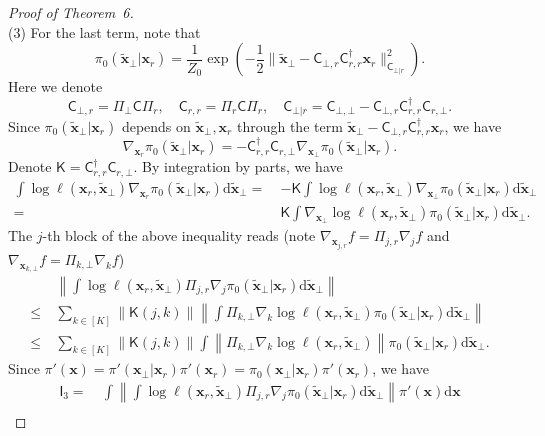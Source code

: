 \documentclass[10pt,a4paper]{amsart}
\newcommand{\Brac}[1]{\left(#1\right)}
\newcommand{\bx}{{\boldsymbol{x}}}
\newcommand{\mdd}{\mathrm{d}}
\newcommand{\norm}[1]{\left\|#1\right\|}
\newcommand{\normo}[1]{\|#1\|}
\newcommand{\sfC}{\mathsf{C}}
\newcommand{\sfI}{\mathsf{I}}
\newcommand{\sfK}{\mathsf{K}}
\begin{document}
\begin{proof}[Proof of Theorem~6]
\ \\[-5pt]
\noindent
(3) For the last term, note that
\[
    \pi_0(\widetilde{\bx}_\bot|\bx_r) = \frac{1}{Z_0} \exp \Brac{ - \frac{1}{2} \normo{ \widetilde{\bx}_\bot - \sfC_{\bot,r} \sfC_{r,r}^\dag \bx_r }^2_{\sfC_{\bot|r}}  }.
\]
Here we denote 
\[
    \sfC_{\bot,r} = \Pi_{\bot} \sfC \Pi_{r}, \quad \sfC_{r,r} = \Pi_{r} \sfC \Pi_{r}, \quad \sfC_{\bot|r} = \sfC_{\bot,\bot} - \sfC_{\bot,r} \sfC_{r,r}^\dag \sfC_{r,\bot}.
\]
Since $\pi_0(\widetilde{\bx}_\bot|\bx_r)$ depends on $\widetilde{\bx}_\bot,\bx_r$ through the term $\widetilde{\bx}_\bot - \sfC_{\bot,r} \sfC_{r,r}^\dag \bx_r$, we have
\[
    \nabla_{\bx_r} \pi_0(\widetilde{\bx}_\bot|\bx_r) = - \sfC_{r,r}^\dag \sfC_{r,\bot} \nabla_{\bx_\bot} \pi_0(\widetilde{\bx}_\bot|\bx_r). 
\]
Denote $\sfK = \sfC_{r,r}^\dag \sfC_{r,\bot}$. By integration by parts, we have 
\begin{align*}
    \int \log \ell(\bx_r,\widetilde{\bx}_\bot) \nabla_{\bx_r} \pi_0(\widetilde{\bx}_\bot|\bx_r) \mdd \widetilde{\bx}_\bot =~& - \sfK \int \log \ell(\bx_r,\widetilde{\bx}_\bot) \nabla_{\bx_\bot} \pi_0(\widetilde{\bx}_\bot|\bx_r) \mdd \widetilde{\bx}_\bot \\
    =~& \sfK \int \nabla_{\bx_\bot} \log \ell(\bx_r,\widetilde{\bx}_\bot) \pi_0(\widetilde{\bx}_\bot|\bx_r) \mdd \widetilde{\bx}_\bot.
\end{align*}
%
The $j$-th block of the above inequality reads (note $\nabla_{\bx_{j,r}} f = \Pi_{j,r} \nabla_j f$ and $\nabla_{\bx_{k,\bot}} f = \Pi_{k,\bot} \nabla_k f$)
\begin{align*}
    & \norm{ \int \log \ell(\bx_r,\widetilde{\bx}_\bot) \Pi_{j,r} \nabla_j \pi_0(\widetilde{\bx}_\bot|\bx_r) \mdd \widetilde{\bx}_\bot } \\
    \le~& \sum_{k\in[K]} \norm{\sfK(j,k)} \norm{ \int \Pi_{k,\bot} \nabla_k \log \ell(\bx_r,\widetilde{\bx}_\bot) \pi_0(\widetilde{\bx}_\bot|\bx_r) \mdd \widetilde{\bx}_\bot } \\
    \le~& \sum_{k\in[K]} \norm{\sfK(j,k)} \int \norm{ \Pi_{k,\bot} \nabla_k \log \ell(\bx_r,\widetilde{\bx}_\bot) }\pi_0(\widetilde{\bx}_\bot|\bx_r) \mdd \widetilde{\bx}_\bot. 
\end{align*}
Since $\pi'(\bx) = \pi'(\bx_\bot|\bx_r) \pi'(\bx_r) = \pi_0(\bx_\bot|\bx_r) \pi'(\bx_r)$, we have
\begin{align*}
    \sfI_3 =~& \int \norm{ \int \log \ell(\bx_r,\widetilde{\bx}_\bot) \Pi_{j,r} \nabla_j \pi_0(\widetilde{\bx}_\bot|\bx_r) \mdd \widetilde{\bx}_\bot } \pi'(\bx) \mdd \bx \\

\end{align*}
\end{proof}
\end{document}
